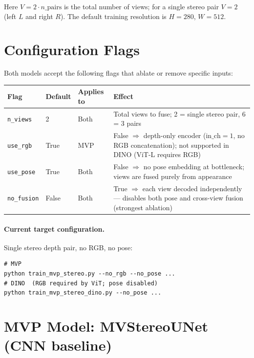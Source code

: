 \documentclass[11pt]{article}
\begin{document}
Here $V = 2 \cdot n\_\text{pairs}$ is the total number of views; for a single
stereo pair $V=2$ (left $L$ and right $R$).  The default training resolution is
$H=280$, $W=512$.

\section{\textcolor{flaggray}{Configuration Flags}}

Both models accept the following flags that ablate or remove specific inputs:

\begin{center}
\begin{tabular}{lllp{6.5cm}}
\toprule
\textbf{Flag} & \textbf{Default} & \textbf{Applies to} & \textbf{Effect} \\
\midrule
\texttt{n\_views}   & 2    & Both  & Total views to fuse; 2 = single stereo pair, 6 = 3 pairs \\
\texttt{use\_rgb}   & True & MVP   & False $\Rightarrow$ depth-only encoder ($\text{in\_ch}=1$, no RGB concatenation); not supported in DINO (ViT-L requires RGB) \\
\texttt{use\_pose}  & True & Both  & False $\Rightarrow$ no pose embedding at bottleneck; views are fused purely from appearance \\
\texttt{no\_fusion} & False & Both & True $\Rightarrow$ each view decoded independently --- disables both pose and cross-view fusion (strongest ablation) \\
\bottomrule
\end{tabular}
\end{center}

\paragraph{Current target configuration.}
Single stereo depth pair, no RGB, no pose:
\begin{verbatim}
# MVP
python train_mvp_stereo.py --no_rgb --no_pose ...
# DINO  (RGB required by ViT; pose disabled)
python train_mvp_stereo_dino.py --no_pose ...
\end{verbatim}

\section{\textcolor{cnnblue}{MVP Model: MVStereoUNet (CNN baseline)}}
\end{document}
